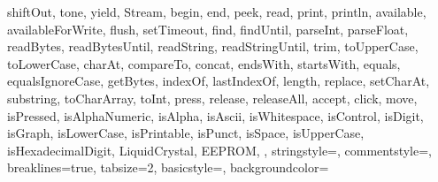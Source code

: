 {{		shiftOut, tone, yield, Stream, begin, end, peek, read, print, 
		println, available, availableForWrite, flush, setTimeout, find, 
		findUntil, parseInt, parseFloat, readBytes, readBytesUntil, readString, 
		readStringUntil, trim, toUpperCase, toLowerCase, charAt, compareTo, 
		concat, endsWith, startsWith, equals, equalsIgnoreCase, getBytes, 
		indexOf, lastIndexOf, length, replace, setCharAt, substring, 
		toCharArray, toInt, press, release, releaseAll, accept, click, move, 
		isPressed, isAlphaNumeric, isAlpha, isAscii, isWhitespace, isControl, 
		isDigit, isGraph, isLowerCase, isPrintable, isPunct, isSpace, 
		isUpperCase, isHexadecimalDigit, 
		LiquidCrystal,
		EEPROM,
	},      
	stringstyle=\color{arduinoDarkBlue},    
	commentstyle=\color{arduinoGrey},    
	breaklines=true,                    %
	tabsize=2,         
	basicstyle=\ttfamily ,
	backgroundcolor=\color{backcolour!50}
}